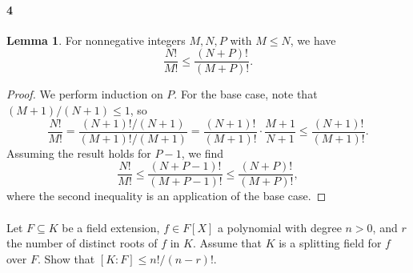 \documentclass[12pt]{article}
\newlength{\myparskip}
\newenvironment{fullbox}{\begin{lrbox}{\savefullbox}\begin{minipage}{\dimexpr\textwidth-2\fboxsep\relax}\setlength{\parskip}{\myparskip}}{\end{minipage}\end{lrbox}\framebox[\textwidth]{\usebox{\savefullbox}}}
\newenvironment{pbox}[1][]{\begin{fullbox}\def\temp{#1}\ifx\temp\empty\else\paragraph{#1}\phantom{}\fi}{\end{fullbox}}
\theoremstyle{definition}
\newtheorem{lemma}{Lemma}
\newcommand{\<}{\langle}
\renewcommand{\>}{\rangle}
\newcommand{\seq}{\subseteq}
\begin{document}
\newpage

\begin{pbox}[4]
    
\end{pbox}

\begin{lemma}
    For nonnegative integers $M, N, P$ with $M \leq N$, we have
    \[
        \frac{N!}{M!} \leq \frac{(N + P)!}{(M + P)!}.
    \]
\end{lemma}

\begin{proof}
    We perform induction on $P$. For the base case, note that $(M + 1)/(N + 1) \leq 1$, so
    \[
        \frac{N!}{M!}
            = \frac{(N + 1)!/(N + 1)}{(M + 1)!/(M + 1)}
            = \frac{(N + 1)!}{(M + 1)!} \cdot \frac{M + 1}{N + 1}
            \leq \frac{(N + 1)!}{(M + 1)!}.
    \]
    Assuming the result holds for $P - 1$, we find
    \[
        \frac{N!}{M!}
            \leq \frac{(N + P - 1)!}{(M + P - 1)!}
            \leq \frac{(N + P)!}{(M + P)!},
    \]
    where the second inequality is an application of the base case.
\end{proof}

\begin{pbox}[]
    Let $F \seq K$ be a field extension, $f \in F[X]$ a polynomial with degree $n > 0$, and $r$ the number of distinct roots of $f$ in $K$.
    Assume that $K$ is a splitting field for $f$ over $F$.
    Show that $[K : F] \leq n!/(n - r)!$.
\end{pbox}
\end{document}
